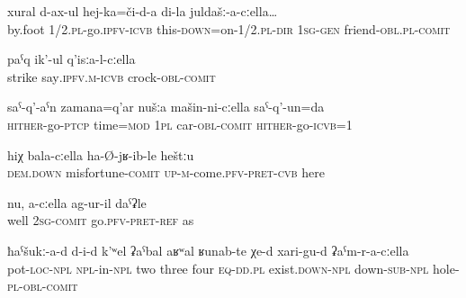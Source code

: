 \begin{exe}
	\ex	\label{ex:we (were) going by foot there with my friends} 
	\gll	xural	d-ax-ul	hej-ka=či-d-a	di-la	juldašː-a-cːella\ldots\\
		by.foot 1/2.\textsc{pl}-go.\textsc{ipfv}-\textsc{icvb} this-\textsc{down}=on-1/2.\textsc{pl}-\textsc{dir} 1\textsc{sg}-\textsc{gen} friend-\textsc{obl}.\textsc{pl}-\textsc{comit}\\
	\glt	{}
	
	\ex	\label{ex:striking with the crock}
	\gll	paˁq ik'-ul q'isːa-l-cːella\\
		strike say\textsc{.ipfv.m-icvb} crock-\textsc{obl-comit}\\
	\glt	{}
	
	\ex	\label{ex:When we go back, we go by car}
	\gll	saˁ-q'-aˁn	zamana=q'ar	nušːa	mašin-ni-cːella	saˁ-q'-un=da \\
		\textsc{hither}-go-\textsc{ptcp}	time=\textsc{mod}	1\textsc{pl}	car-\textsc{obl}-\textsc{comit}	\textsc{hither}-go-\textsc{icvb}=1\\
	\glt	{}
	
	\ex	\label{ex:when he came here with sorrow}
	\gll	hiχ	bala-cːella	ha-Ø-jʁ-ib-le	heštːu\\
		\textsc{dem.down}	misfortune-\textsc{comit}	\textsc{up}-\textsc{m}-come.\textsc{pfv}-\textsc{pret}-\textsc{cvb}	here\\
	\glt	{}
	
	\ex	\label{ex:as if it happened with you}
	\gll	nu,	a-cːella	ag-ur-il	daˁʡle \\
		well	2\textsc{sg}-\textsc{comit}	go.\textsc{pfv}-\textsc{pret}-\textsc{ref} as\\
	\glt	{}
		
	\ex	\label{ex:Inside the pot there are 2, 3, 4, things like this with holes on the lower side}
	\gll	ħaˁšukː-a-d	d-i-d	k'ʷel	ʡaˁbal	aʁʷal	ʁunab-te	χe-d	xari-gu-d	ʡaˁm-r-a-cːella\\
		pot-\textsc{loc}-\textsc{npl}	\textsc{npl}-in-\textsc{npl} two	three	four	\textsc{eq}-\textsc{dd.pl} 	exist.\textsc{down-npl}	down-\textsc{sub}-\textsc{npl	} hole-\textsc{pl}-\textsc{obl}-\textsc{comit}\\
	\glt	{}
\end{exe}


